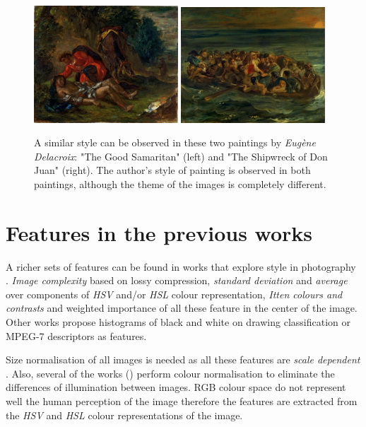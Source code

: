 \documentclass[11pt,a4paper,draft]{report}
\begin{document}
\begin{multicols}{2}
\begin{figure}[tb]
\centering
\includegraphics[width=0.48\textwidth]{sim_delacroix_samaritan}
\includegraphics[width=0.48\textwidth]{sim_delacroix_shipwreck}
\caption[Example of similar styles]{A similar style can be observed in these
two paintings by \emph{Eug\`ene Delacroix}: "The Good Samaritan" (left) and
"The Shipwreck of Don Juan" (right).  The author's style of painting is
observed in both paintings, although the theme of the images is completely
different.}
\label{fig:similar}
\end{figure}

\section{Features in the previous works}

A richer sets of features can be found in works that explore style in
photography \cite{jma12clas,cmrc13fs,rmc12ajs,mach10clas}.  \emph{Image
complexity} based on lossy compression, \emph{standard deviation} and
\emph{average} over components of \emph{HSV} and/or \emph{HSL} colour
representation, \emph{Itten colours and contrasts} and weighted importance of
all these feature in the center of the image.  Other works propose histograms
of black and white on drawing classification \cite{kroner98draw} or MPEG-7
descriptors as features.

Size normalisation of all images is needed as all these features are
\emph{scale dependent} \cite{jma12clas,mach10clas}.  Also, several of the works
(\cite{jma12clas,cmrc13fs,rmc12ajs}) perform colour normalisation to eliminate
the differences of illumination between images.  RGB colour space do not
represent well the human perception of the image \cite{mach10clas} therefore
the features are extracted from the \emph{HSV} and \emph{HSL} colour
representations of the image.


\end{multicols}
\end{document}
